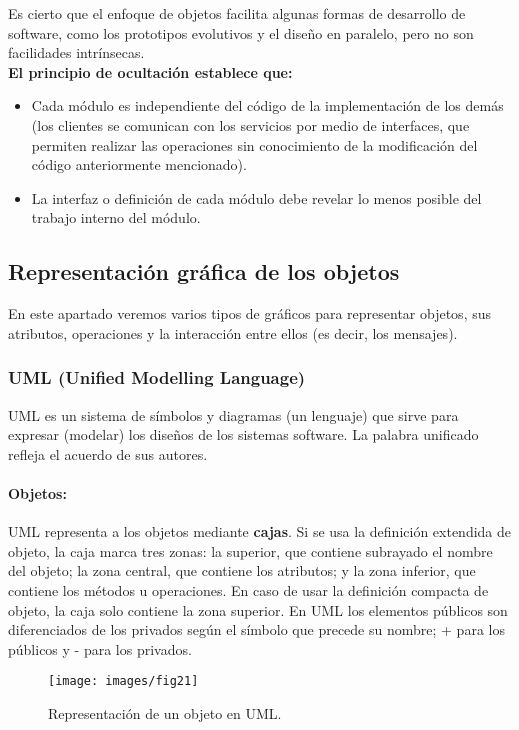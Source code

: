 Es cierto que el enfoque de objetos facilita algunas formas de
desarrollo de software, como los prototipos evolutivos y el diseño en
paralelo, pero no son facilidades intrínsecas.\\
\textbf{El principio de ocultación establece que:}
\begin{itemize}
\item Cada módulo es independiente del código de la implementación
  de los demás (los clientes se comunican con los servicios por
  medio de interfaces, que permiten realizar las operaciones sin
  conocimiento de la modificación del código anteriormente
  mencionado).
\item La interfaz o definición de cada módulo debe revelar lo menos
  posible del trabajo interno del módulo.
\end{itemize}

\newpage

\subsection{Representación gráfica de los objetos}
En este apartado veremos varios tipos de gráficos para representar
objetos, sus atributos, operaciones y la interacción entre ellos (es
decir, los mensajes).
\subsubsection{UML (Unified Modelling Language)}
UML es un sistema de símbolos y diagramas (un lenguaje) que sirve para
expresar (modelar) los diseños de los sistemas software. La palabra
unificado refleja el acuerdo de sus autores.

\paragraph{Objetos:}
UML representa a los objetos mediante \textbf{cajas}. Si se usa la
definición extendida de objeto, la caja marca tres zonas: la superior,
que contiene subrayado el nombre del objeto; la zona central, que contiene
los atributos; y la zona inferior, que contiene los métodos u operaciones. En caso de usar
la definición compacta de objeto, la caja solo contiene la zona
superior. En UML los elementos públicos son diferenciados de los
privados según el símbolo que precede su nombre; \textrm{+} para los públicos
y \textrm{-} para los privados.

\begin{figure}[ht!]  \centering
  \texttt{[image: images/fig21]}
  \caption{Representación de un objeto en UML.}
  \label{fig:21}
\end{figure}


